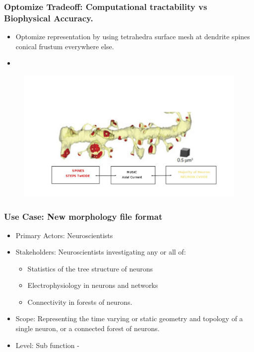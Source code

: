 \documentclass[notes=hide]{beamer}
\begin{document}
{\begin{frame}

\frametitle{Optomize Tradeoff: Computational tractability vs Biophysical Accuracy.}
\begin{itemize}
\begin{itemize}
\item Optomize representation by using tetrahedra surface mesh at dendrite spines conical frustum everywhere else.
\item \cite{hepburn2013efficient} \cite{grein20141d} \cite{bito2010chemical}%

\vfill
\end{itemize}

\begin{figure}
\includegraphics[scale=0.27525]{multisimulatorinterface2.jpg}
\end{figure}
\end{itemize}
\vfill
\vfill

\end{frame}

\begin{frame}
\frametitle{Use Case: New morphology file format}

\begin{itemize}
\item Primary Actors: Neuroscientists %
\vfill
\item Stakeholders: Neuroscientists investigating any or all of: 
\begin{itemize}
\item Statistics of the tree structure of neurons
\item Electrophysiology in neurons and networks
\item Connectivity in forests of neurons.
\end{itemize}
\vfill
\item Scope: Representing the time varying or static geometry and topology of a single neuron, or a connected forest of neurons.
\vfill
\item Level: Sub function -
\end{itemize}
\end{frame}

}
\end{document}
